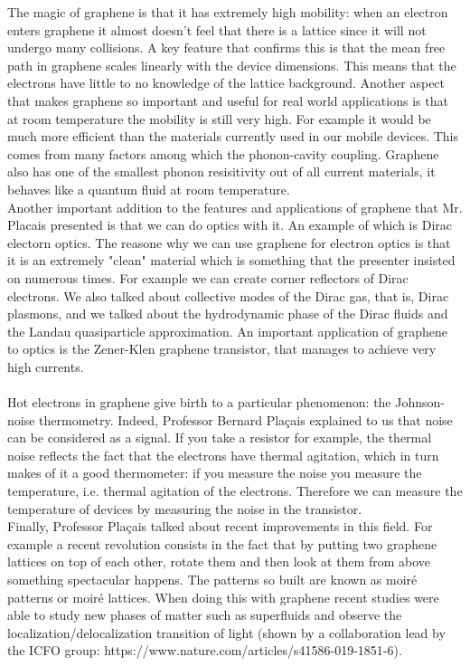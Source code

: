 \documentclass[12pt,a4paper]{article}
\begin{document}
The magic of graphene is that it has extremely high mobility: when an electron enters graphene it almost doesn't feel that there is a lattice since it will not undergo many collisions. A key feature that confirms this is that the mean free path in graphene scales linearly with the device dimensions. This means that the electrons have little to no knowledge of the lattice background. Another aspect that makes graphene so important and useful for real world applications is that at room temperature the mobility is still very high. For example it would be much more efficient than the materials currently used in our mobile devices. This comes from many factors among which the phonon-cavity coupling. Graphene also has one of the smallest phonon resisitivity out of all current materials, it behaves like a quantum fluid at room temperature.\\
Another important addition to the features and applications of graphene that Mr. Placais presented is that we can do optics with it. An example of which is Dirac electorn optics. The reasone why we can use graphene for electron optics is that it is an extremely "clean" material which is something that the presenter insisted on numerous times. For example we can create corner reflectors of Dirac electrons. We also talked about collective modes of the Dirac gas, that is, Dirac plasmons, and we talked about the hydrodynamic phase of the Dirac fluids and the Landau quasiparticle approximation. An important application of graphene to optics is the Zener-Klen graphene transistor, that manages to achieve very high currents. \\\\
Hot electrons in graphene give birth to a particular phenomenon: the Johnson-noise thermometry. Indeed, Professor Bernard Plaçais explained to us that noise can be considered as a signal. If you take a resistor for example, the thermal noise reflects the fact that the electrons have thermal agitation, which in turn makes of it a good thermometer: if you measure the noise you measure the temperature, i.e. thermal agitation of the electrons. Therefore we can measure the temperature of devices by measuring the noise in the transistor. \\
Finally, Professor Plaçais talked about recent improvements in this field. For example a recent revolution consists in the fact that by putting two graphene lattices on top of each other, rotate them and then look at them from above something spectacular happens. The patterns so built are known as moiré patterns or moiré lattices. When doing this with graphene recent studies were able to study new phases of matter such as superfluids and observe the localization/delocalization transition of light (shown by a collaboration lead by the ICFO group: https://www.nature.com/articles/s41586-019-1851-6). \\
\end{document}
